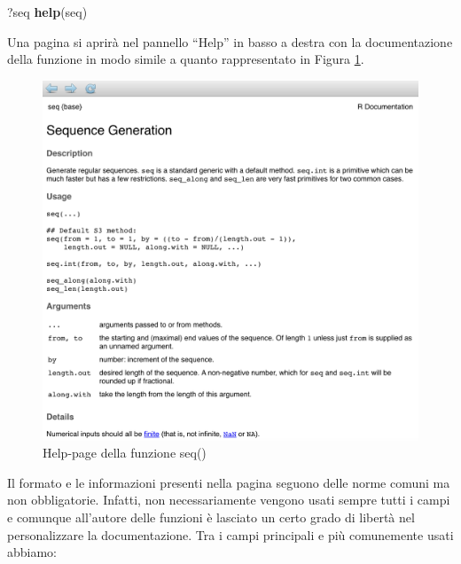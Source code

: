 \documentclass[
]{book}
\newenvironment{Shaded}{\begin{snugshade}}{\end{snugshade}}
\newcommand{\KeywordTok}[1]{\textcolor[rgb]{0.13,0.29,0.53}{\textbf{#1}}}
\newcommand{\NormalTok}[1]{#1}
\begin{document}
\begin{Shaded}
\begin{Highlighting}[]
\NormalTok{?seq}
\KeywordTok{help}\NormalTok{(seq)}
\end{Highlighting}
\end{Shaded}

Una pagina si aprirà nel pannello ``Help'' in basso a destra con la documentazione della funzione in modo simile a quanto rappresentato in Figura \ref{fig:help-page}.

\begin{figure}

{\centering \includegraphics[width=0.85\linewidth]{images/help-seq} 

}

\caption{Help-page della funzione seq()}\label{fig:help-page}
\end{figure}

Il formato e le informazioni presenti nella pagina seguono delle norme comuni ma non obbligatorie. Infatti, non necessariamente vengono usati sempre tutti i campi e comunque all'autore delle funzioni è lasciato un certo grado di libertà nel personalizzare la documentazione. Tra i campi principali e più comunemente usati abbiamo:
\end{document}
